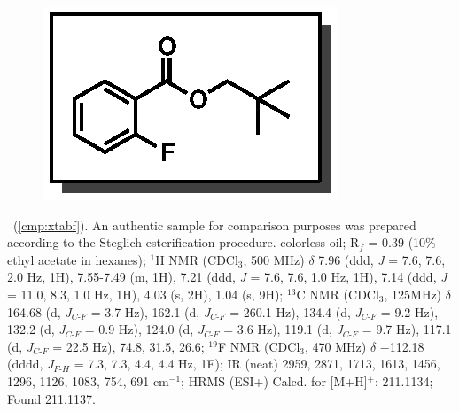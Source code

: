 \pagebreak
\begin{figure}
  \vspace{-18pt}
  \begin{center}
    \includegraphics[scale=0.8]{chp_asymmetric/images/xtabf}
  \end{center}
  \vspace{-35pt}
\end{figure}\noindent \textbf{\CMPxtabf}\ (\ref{cmp:xtabf}). An authentic
sample for comparison purposes was prepared according to the Steglich
esterification procedure.
colorless oil; R$_f$ = 0.39 (10\% ethyl acetate in hexanes); $^1$H NMR (CDCl$_3$, 500 MHz) $\delta$ 7.96 (ddd, \textit{J} = 7.6, 7.6, 2.0 Hz, 1H),
7.55-7.49 (m, 1H), 7.21 (ddd, \textit{J} = 7.6, 7.6, 1.0 Hz, 1H), 7.14 (ddd,
\textit{J} = 11.0, 8.3, 1.0 Hz, 1H), 4.03 (s, 2H), 1.04 (s, 9H); $^{13}$C NMR
(CDCl$_3$, 125MHz) $\delta$ 164.68 (d, \textit{J}$_{C\mbox{-}F}$ = 3.7 Hz),
162.1 (d, \textit{J}$_{C\mbox{-}F}$ = 260.1 Hz), 134.4 (d,
\textit{J}$_{C\mbox{-}F}$ = 9.2 Hz), 132.2 (d, \textit{J}$_{C\mbox{-}F}$ = 0.9
Hz), 124.0 (d, \textit{J}$_{C\mbox{-}F}$ = 3.6 Hz), 119.1 (d,
\textit{J}$_{C\mbox{-}F}$ = 9.7 Hz), 117.1 (d, \textit{J}$_{C\mbox{-}F}$ = 22.5
Hz), 74.8, 31.5, 26.6; $^{19}$F NMR (CDCl$_3$, 470 MHz) $\delta$ $-$112.18
(dddd, \textit{J}$_{F\mbox{-}H}$ = 7.3, 7.3, 4.4, 4.4 Hz, 1F); IR (neat) 2959, 2871,
1713, 1613, 1456, 1296, 1126, 1083, 754, 691 cm$^{-1}$; HRMS (ESI+) Calcd. for
 [M+H]$^+$: 211.1134; Found 211.1137.

